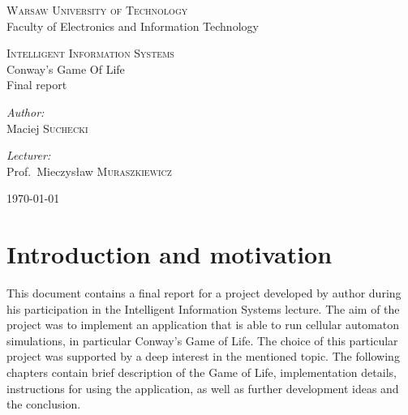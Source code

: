 \documentclass[11pt,a4paper]{article}
\begin{document}
\begin{titlepage}
  \begin{center}

    \textsc{\Large Warsaw University of Technology}\\[0.1cm]
    \small Faculty of Electronics and Information Technology
    \vfill

    \textsc{\small Intelligent Information Systems}\\[0.1cm]
    \Huge Conway's Game Of Life\\[1.5cm]
    \small Final report\\[2.5cm]

    \vfill

    \begin{minipage}{0.4\textwidth}
      \begin{flushleft} \large
        \emph{Author:}\\[0.1cm]
        Maciej \textsc{Suchecki}\\
      \end{flushleft}
    \end{minipage}
    \begin{minipage}{0.4\textwidth}
      \begin{flushright} \large
        \emph{Lecturer:}\\[0.1cm]
        Prof.~Mieczysław \textsc{Muraszkiewicz}\\[1cm]
      \end{flushright}
    \end{minipage}

    \vfill
    {\large \today}

  \end{center}
\end{titlepage}

\section{Introduction and motivation}
This document contains a final report for a project developed by author during his participation in the Intelligent Information Systems lecture. The aim of the project was to implement an application that is able to run cellular automaton simulations, in particular Conway's Game of Life. The choice of this particular project was supported by a deep interest in the mentioned topic. The following chapters contain brief description of the Game of Life, implementation details, instructions for using the application, as well as further development ideas and the conclusion.
\end{document}
